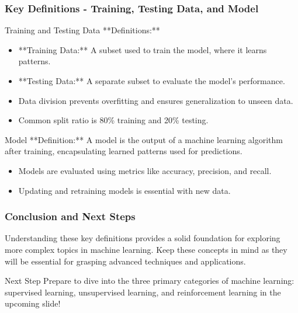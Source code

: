 \documentclass[aspectratio=169]{beamer}
\begin{document}
\begin{frame}[fragile]
    \frametitle{Key Definitions - Training, Testing Data, and Model}
    \begin{block}{Training and Testing Data}
        **Definitions:**
        \begin{itemize}
            \item **Training Data:** A subset used to train the model, where it learns patterns.
            \item **Testing Data:** A separate subset to evaluate the model's performance.
        \end{itemize}
    \end{block}
    \begin{itemize}
        \item Data division prevents overfitting and ensures generalization to unseen data.
        \item Common split ratio is 80\% training and 20\% testing.
    \end{itemize}
    
    \begin{block}{Model}
        **Definition:**  
        A model is the output of a machine learning algorithm after training, encapsulating learned patterns used for predictions.
    \end{block}
    \begin{itemize}
        \item Models are evaluated using metrics like accuracy, precision, and recall.
        \item Updating and retraining models is essential with new data.
    \end{itemize}
\end{frame}

\begin{frame}[fragile]
    \frametitle{Conclusion and Next Steps}
    Understanding these key definitions provides a solid foundation for exploring more complex topics in machine learning. Keep these concepts in mind as they will be essential for grasping advanced techniques and applications.
    
    \begin{block}{Next Step}
        Prepare to dive into the three primary categories of machine learning: supervised learning, unsupervised learning, and reinforcement learning in the upcoming slide!
    \end{block}
\end{frame}
\end{document}
